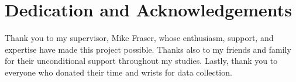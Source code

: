 \documentclass[ oneside,%
                    author={Jack Jarvis},
                    degree={BSc},
                     title={FlexIR: Flexible PCB Wristbands for Infrared Based Gesture Recognition},
                    unit={COMS30045},
                    subtitle={Investigating the Effect of LED Viewing Angle on Gesture Classification in Infrared Sensing Systems}]{dissertation}
\begin{document}



\chapter*{Dedication and Acknowledgements}

\vspace{1cm} 

\noindent

Thank you to my supervisor, Mike Fraser, whose enthusiasm, support, and expertise have made this project possible. Thanks also to my friends and family for their unconditional support throughout my studies. Lastly, thank you to everyone who donated their time and wrists for data collection.




\makedecl




\makeaidecl
\end{document}
